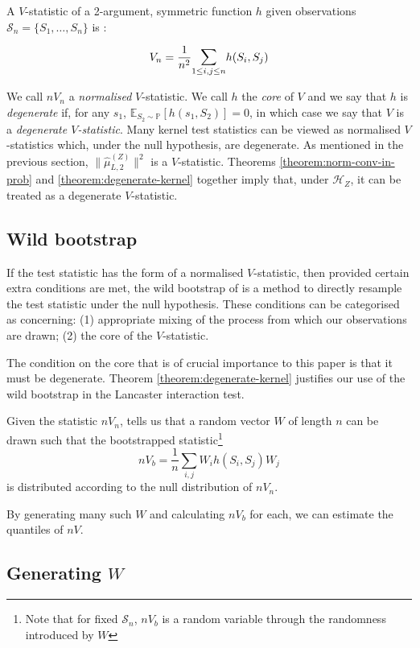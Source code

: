 \documentclass[]{article}
\begin{document}
  
A $V$-statistic of a 2-argument, symmetric function $h$ given  observations $\mathcal{S}_n = \{S_1,\ldots,S_n\}$  is \citep{serfling2009approximation}:

\[ V_n =  \frac{1}{n^2} \mathlarger{\sum}_{1\leq i,j \leq n} h(S_i,S_j)\]


We call $nV_n$ a \emph{normalised} $V$-statistic. We call $h$ the \emph{core} of $V$ and we say that $h$ is \emph{degenerate} if, for any $s_1$, $\mathbb{E}_{S_2 \sim \mathbb{P}}[h(s_1,S_2)] = 0$, in which case we say that $V$ is a \emph{degenerate $V$-statistic}. Many kernel test statistics can be viewed as normalised $V$-statistics which, under the null hypothesis, are degenerate. As mentioned in the previous section,  $\|\hat \mu^{(Z)}_{L,2}\|^2$ is a $V$-statistic. Theorems \ref{theorem:norm-conv-in-prob} and \ref{theorem:degenerate-kernel} together imply that, under $\mathcal{H}_Z$, it can be treated as a degenerate $V$-statistic. 

\subsection{Wild bootstrap}

If the test statistic has the form of a normalised $V$-statistic, then provided certain extra conditions are met, the wild bootstrap of \citet{leucht2013dependent} is a method to directly resample the test statistic under the null hypothesis. These conditions can be categorised as concerning: (1) appropriate mixing of the process from which our observations are drawn; (2) the core of the $V$-statistic. 

The condition on the core that is of crucial importance to this paper is that it must be degenerate. Theorem \ref{theorem:degenerate-kernel} justifies our use of the wild bootstrap in the Lancaster interaction test.

Given the statistic $nV_n$, \citet{leucht2013dependent} tells us that a random vector $W$ of length $n$ can be drawn such that the bootstrapped statistic\footnote{Note that for fixed $\mathcal{S}_n$, $nV_b$ is a random variable through the randomness introduced by $W$}
\[nV_b=\frac{1}{n}\sum_{i,j}W_{i}h(S_i,S_j)W_{j}\]
is distributed according to the null distribution of $nV_n$. 

By generating many such $W$ and calculating $nV_b$ for each, we can estimate the quantiles of $nV$. 

\subsection{Generating $W$}
\end{document}
